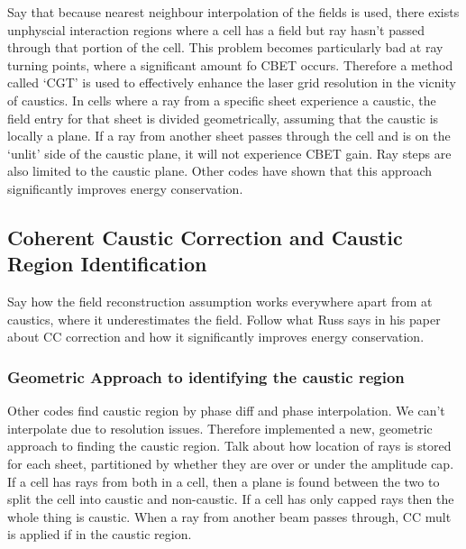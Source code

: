 Say that because nearest neighbour interpolation of the fields is used, there exists unphyscial interaction regions where a cell has a field but ray hasn't passed through that portion of the cell.
This problem becomes particularly bad at ray turning points, where a significant amount fo CBET occurs.
Therefore a method called `CGT' is used to effectively enhance the laser grid resolution in the vicnity of caustics.
In cells where a ray from a specific sheet experience a caustic, the field entry for that sheet is divided geometrically, assuming that the caustic is locally a plane.
If a ray from another sheet passes through the cell and is on the `unlit' side of the caustic plane, it will not experience CBET gain.
Ray steps are also limited to the caustic plane.
Other codes have shown that this approach significantly improves energy conservation.

\subsection{Coherent Caustic Correction and Caustic Region Identification}

Say how the field reconstruction assumption works everywhere apart from at caustics, where it underestimates the field.
Follow what Russ says in his paper about CC correction and how it significantly improves energy conservation.

\subsubsection{Geometric Approach to identifying the caustic region}

Other codes find caustic region by phase diff and phase interpolation.
We can't interpolate due to resolution issues.
Therefore implemented a new, geometric approach to finding the caustic region.
Talk about how location of rays is stored for each sheet, partitioned by whether they are over or under the amplitude cap.
If a cell has rays from both in a cell, then a plane is found between the two to split the cell into caustic and non-caustic.
If a cell has only capped rays then the whole thing is caustic.
When a ray from another beam passes through, CC mult is applied if in the caustic region.


